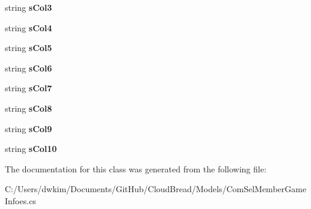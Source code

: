 \begin{DoxyCompactItemize}
\item 
string {\bfseries s\+Col3}\hypertarget{a00059_a4ff4808f1c611f98633869e29a3dc2e1}{}\label{a00059_a4ff4808f1c611f98633869e29a3dc2e1}

\item 
string {\bfseries s\+Col4}\hypertarget{a00059_a5345ad0e943de50af8e7799f83a3afab}{}\label{a00059_a5345ad0e943de50af8e7799f83a3afab}

\item 
string {\bfseries s\+Col5}\hypertarget{a00059_a3685ae6866dd991cd43bcfe3ea44a0f6}{}\label{a00059_a3685ae6866dd991cd43bcfe3ea44a0f6}

\item 
string {\bfseries s\+Col6}\hypertarget{a00059_abb865f2f09e52fe29342f7c68d412e1e}{}\label{a00059_abb865f2f09e52fe29342f7c68d412e1e}

\item 
string {\bfseries s\+Col7}\hypertarget{a00059_a5b3c51e2c01591c3bb246fbb889ee2c3}{}\label{a00059_a5b3c51e2c01591c3bb246fbb889ee2c3}

\item 
string {\bfseries s\+Col8}\hypertarget{a00059_a7ca71320035d93755f573457c83fc1f1}{}\label{a00059_a7ca71320035d93755f573457c83fc1f1}

\item 
string {\bfseries s\+Col9}\hypertarget{a00059_a44e121402c7ed38a6498a6c5316c41f8}{}\label{a00059_a44e121402c7ed38a6498a6c5316c41f8}

\item 
string {\bfseries s\+Col10}\hypertarget{a00059_ae816caa1d7922f2a608f463f89f4be1b}{}\label{a00059_ae816caa1d7922f2a608f463f89f4be1b}

\end{DoxyCompactItemize}


The documentation for this class was generated from the following file\+:\begin{DoxyCompactItemize}
\item 
C\+:/\+Users/dwkim/\+Documents/\+Git\+Hub/\+Cloud\+Bread/\+Models/Com\+Sel\+Member\+Game\+Infoes.\+cs\end{DoxyCompactItemize}
